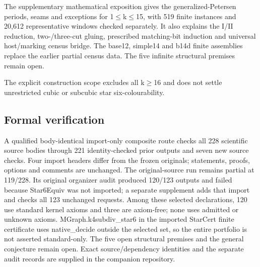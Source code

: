 \documentclass[11pt,a4paper]{article}
\begin{document}
The supplementary mathematical exposition gives the generalized-Petersen periods, seams and exceptions for 1\ensuremath{\leq}k\ensuremath{\leq}15, with 519 finite instances and 20,612 representative windows checked separately. It also explains the I/II reduction, two-/three-cut gluing, prescribed matching-bit induction and universal host/marking census bridge. The base12, simple14 and b14d finite assemblies replace the earlier partial census data. The five infinite structural premises remain open.

The explicit construction scope excludes all k\ensuremath{\geq}16 and does not settle unrestricted cubic or subcubic star six-colourability.

\subsection{Formal verification}
A qualified body-identical import-only composite route checks all 228 scientific source bodies through 221 identity-checked prior outputs and seven new source checks. Four import headers differ from the frozen originals; statements, proofs, options and comments are unchanged. The original-source run remains partial at 119/228. Its original organizer audit produced 120/123 outputs and failed because Star6Equiv was not imported; a separate supplement adds that import and checks all 123 unchanged requests. Among these selected declarations, 120 use standard kernel axioms and three are axiom-free; none uses admitted or unknown axioms. MGraph.k4subdiv\_star6 in the imported StarCert finite certificate uses native\_decide outside the selected set, so the entire portfolio is not asserted standard-only. The five open structural premises and the general conjecture remain open. Exact source/dependency identities and the separate audit records are supplied in the companion repository.
\end{document}
